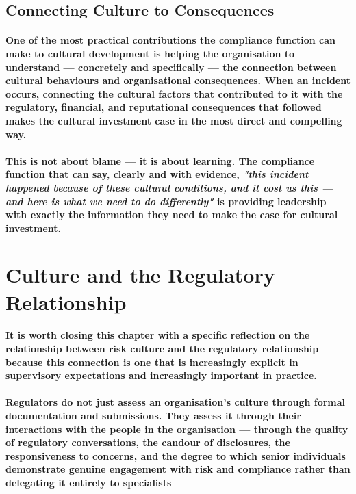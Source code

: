 \subsection{Connecting Culture to Consequences}
\paragraph{One of the most practical contributions the compliance function can make to cultural development is helping the organisation to understand — concretely and specifically — the connection between cultural behaviours and organisational consequences. When an incident occurs, connecting the cultural factors that contributed to it with the regulatory, financial, and reputational consequences that followed makes the cultural investment case in the most direct and compelling way.}
\paragraph{This is not about blame — it is about learning. The compliance function that can say, clearly and with evidence, \textit{"this incident happened because of these cultural conditions, and it cost us this — and here is what we need to do differently"} is providing leadership with exactly the information they need to make the case for cultural investment.}

\section{Culture and the Regulatory Relationship}
\paragraph{It is worth closing this chapter with a specific reflection on the relationship between risk culture and the regulatory relationship — because this connection is one that is increasingly explicit in supervisory expectations and increasingly important in practice.}
\paragraph{Regulators do not just assess an organisation's culture through formal documentation and submissions. They assess it through their interactions with the people in the organisation — through the quality of regulatory conversations, the candour of disclosures, the responsiveness to concerns, and the degree to which senior individuals demonstrate genuine engagement with risk and compliance rather than delegating it entirely to specialists}
